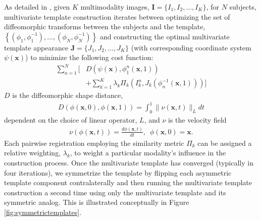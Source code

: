 \documentclass[preprint,authoryear,review,12pt]{elsarticle}
\begin{document}
As detailed in \cite{avants2008,avants2010}, 
given $K$ multimodality images, ${\mathbf I} = \{I_1,I_2,\ldots, I_K\}$, 
for $N$ subjects,  multivariate 
template construction iterates between optimizing the set 
of diffeomorphic transforms between the subjects and the 
template, 
$\left\{\left(\phi_1,\phi_1^{-1}\right),\ldots,\left(\phi_N,\phi_N^{-1}\right)\right\}$ 
and constructing the 
optimal multivariate template appearance 
$\mathbf{J}=\{J_1,J_2,\ldots, J_K\}$ (with corresponding 
coordinate system $\psi(\mathbf{x})$) to minimize the
following cost function:
\begin{align}
  \label{test}
  \sum_{n=1}^N \Bigg[ &D \left( \psi(\mathbf{x}),\phi_1^n(\mathbf{x},1)\right) \nonumber  \\
           &+ \sum_{k=1}^K \lambda_k \Pi_k \left(I_k^n,J_k   
           \left(\phi^{-1}_n(\mathbf{x},1)\right)\right)\Bigg]
\end{align}
$D$ is the diffeomorphic shape distance,
\begin{align}
D\left( \phi( \mathbf{x},0),\phi( \mathbf{x},1)\right) = \int_0^1 \| \nu(\mathbf{x},t)\|_L dt
\end{align}
dependent on the choice of linear operator, $L$, and $\nu$
is the velocity field
\begin{align}
\nu\left( \phi(\mathbf{x},t) \right) = \frac{d\phi(\mathbf{x},t)}{dt},\,\,\, \phi(\mathbf{x},0) = \mathbf{x}.
\end{align}
Each pairwise registration employing the similarity metric $\Pi_k$ can 
be assigned a relative weighting, $\lambda_k$, to weight a particular
modality's influence in the construction process.  Once the multivariate
template has converged (typically in four iterations), we symmetrize
the template by flipping each asymmetric template component contralaterally 
and then running the
multivariate template construction a second time using only the multivariate
template and its symmetric analog.  This is illustrated conceptually in
Figure \ref{fig:symmetrictemplates}.
\end{document}
